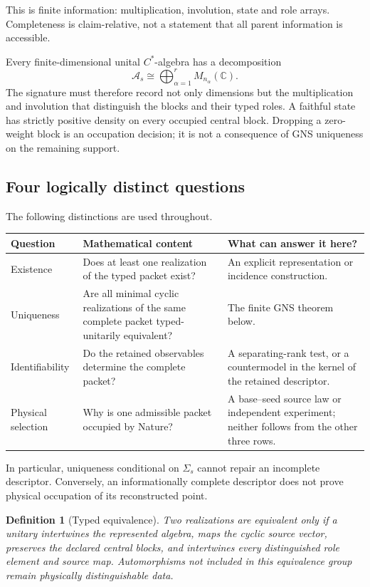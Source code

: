 \documentclass[11pt]{article}
\newtheorem{definition}{Definition}
\begin{document}
This is finite information: multiplication, involution, state and role arrays.
Completeness is claim-relative, not a statement that all parent information is
accessible.

Every finite-dimensional unital \(C^*\)-algebra has a decomposition
\begin{equation}
 \mathcal A_s\cong\bigoplus_{\alpha=1}^{r}M_{n_\alpha}(\mathbb C).
 \label{eq:wedderburn}
\end{equation}
The signature must therefore record not only dimensions but the multiplication
and involution that distinguish the blocks and their typed roles.  A faithful
state has strictly positive density on every occupied central block.  Dropping
a zero-weight block is an occupation decision; it is not a consequence of GNS
uniqueness on the remaining support.

\subsection{Four logically distinct questions}

The following distinctions are used throughout.
\begin{longtable}{p{.18\linewidth}p{.35\linewidth}p{.36\linewidth}}
\toprule
Question & Mathematical content & What can answer it here?\\
\midrule
\endhead
Existence & Does at least one realization of the typed packet exist? & An
explicit representation or incidence construction.\\
Uniqueness & Are all minimal cyclic realizations of the same complete packet
typed-unitarily equivalent? & The finite GNS theorem below.\\
Identifiability & Do the retained observables determine the complete packet? &
A separating-rank test, or a countermodel in the kernel of the retained
descriptor.\\
Physical selection & Why is one admissible packet occupied by Nature? & A
base--seed source law or independent experiment; neither follows from the
other three rows.\\
\bottomrule
\end{longtable}

In particular, uniqueness conditional on \(\Sigma_s\) cannot repair an
incomplete descriptor.  Conversely, an informationally complete descriptor
does not prove physical occupation of its reconstructed point.

\begin{definition}[Typed equivalence]
Two realizations are equivalent only if a unitary intertwines the represented
algebra, maps the cyclic source vector, preserves the declared central blocks,
and intertwines every distinguished role element and source map.  Automorphisms
not included in this equivalence group remain physically distinguishable data.
\end{definition}
\end{document}
